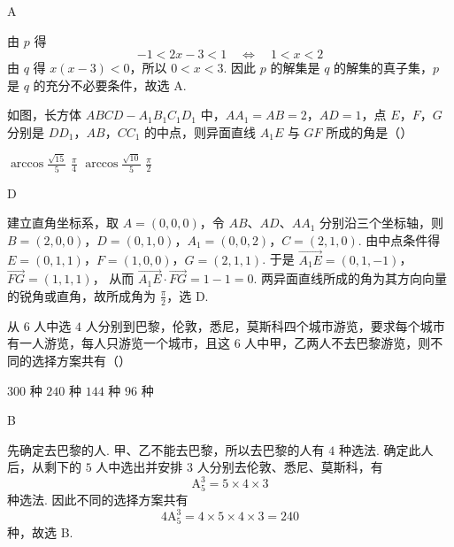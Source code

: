 \begin{answer}
A
\end{answer}

\begin{solution}
由 \(p\) 得
\[
-1<2x-3<1\quad\Longleftrightarrow\quad 1<x<2
\]
由 \(q\) 得 \(x(x-3)<0\)，所以 \(0<x<3\). 因此 \(p\) 的解集是 \(q\) 的解集的真子集，\(p\) 是 \(q\) 的充分不必要条件，故选 A.
\end{solution}



\begin{problem}
如图，长方体 \(ABCD - A_{1}B_{1}C_{1}D_{1}\) 中，\(AA_{1} = AB = 2\)，\(AD = 1\)，点 \(E\)，\(F\)，\(G\) 分别是 \(DD_{1}\)，\(AB\)，\(CC_{1}\) 的中点，则异面直线 \(A_{1}E\) 与 \(GF\) 所成的角是（\quad）


\choices
    {\(\arccos \frac{\sqrt{15}}{5}\)}
    {\(\frac{\pi}{4}\)}
    {\(\arccos \frac{\sqrt{10}}{5}\)}
    {\(\frac{\pi}{2}\)}
\end{problem}

\begin{answer}
D
\end{answer}

\begin{solution}
建立直角坐标系，取 \(A=(0,0,0)\)，令 \(AB\)、\(AD\)、\(AA_1\) 分别沿三个坐标轴，则 \(B=(2,0,0)\)，\(D=(0,1,0)\)，\(A_1=(0,0,2)\)，\(C=(2,1,0)\).
由中点条件得 \(E=(0,1,1)\)，\(F=(1,0,0)\)，\(G=(2,1,1)\). 于是 \(\overrightarrow{A_1E}=(0,1,-1)\)，\(\overrightarrow{FG}=(1,1,1)\)，
从而 \(\overrightarrow{A_1E}\cdot\overrightarrow{FG}=1-1=0\). 两异面直线所成的角为其方向向量的锐角或直角，故所成角为 \(\frac{\pi}{2}\)，选 D.
\end{solution}



\begin{problem}
从 \(6\text{ 人}\)中选 \(4\text{ 人}\)分别到巴黎，伦敦，悉尼，莫斯科四个城市游览，要求每个城市有一人游览，每人只游览一个城市，且这 \(6\text{ 人}\)中甲，乙两人不去巴黎游览，则不同的选择方案共有（\quad）

\choices
    {\(300\text{ 种}\)}
    {\(240\text{ 种}\)}
    {\(144\text{ 种}\)}
    {\(96\text{ 种}\)}
\end{problem}

\begin{answer}
B
\end{answer}

\begin{solution}
先确定去巴黎的人. 甲、乙不能去巴黎，所以去巴黎的人有 \(4\) 种选法. 确定此人后，从剩下的 \(5\) 人中选出并安排 \(3\) 人分别去伦敦、悉尼、莫斯科，有
\[
\mathrm A_5^3=5\times4\times3
\]
种选法. 因此不同的选择方案共有
\[
4\mathrm A_5^3=4\times5\times4\times3=240
\]
种，故选 B.
\end{solution}



